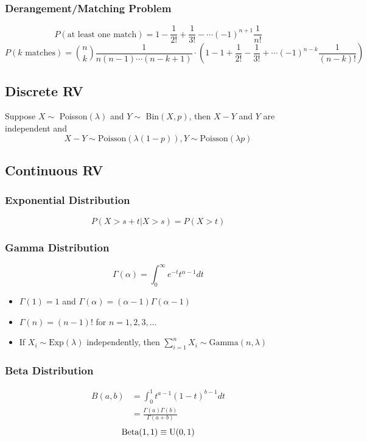 \documentclass{article}
\begin{document}
\subsubsection*{Derangement/Matching Problem}
$$P(\text{at least one match}) = 1 - \frac{1}{2!}+\frac{1}{3!} -\cdots (-1)^{n+1}\frac{1}{n!}$$
$$P(k\text{ matches}) = {n \choose k} \frac{1}{n(n-1)\cdots(n-k+1)}\cdot \left({1- 1 + \frac{1}{2!}-\frac{1}{3!} +\cdots (-1)^{n-k}\frac{1}{(n-k)!}}\right)$$

\begin{multicols}{2}


\subsection{Discrete RV}
Suppose $X \sim$ Poisson$(\lambda)$ and $Y \sim$ Bin$(X,p)$, then
$X-Y$ and $Y$ are independent and 
$$X-Y \sim \text{Poisson}(\lambda(1-p)), Y \sim \text{Poisson}(\lambda p)$$

\subsection{Continuous RV}
\subsubsection*{Exponential Distribution}
\begin{equation*}
 P(X>s+t| X>s) = P(X>t)
\end{equation*}
\subsubsection*{Gamma Distribution}
\begin{equation*}
 \Gamma(\alpha) = \int_{0}^{\infty}e^{-t}t^{\alpha-1}dt
\end{equation*}
\begin{itemize}
 \item $\Gamma(1)= 1$  and $\Gamma(\alpha) = (\alpha-1)\Gamma(\alpha-1)$
 \item $\Gamma(n)=(n-1)!$ for $n = 1,2,3,\dots$
 \item If $X_i \sim \text{Exp}(\lambda)$ independently, then $\sum_{i=1}^n X_i \sim \text{Gamma}(n,\lambda)$
 
\end{itemize}

\subsubsection*{Beta Distribution}
\begin{equation*}
\begin{split}
 B(a,b) &= \int_{0}^{1}t^{a-1}(1-t)^{b-1}dt\\
 &= \frac{\Gamma(a)\Gamma(b)}{\Gamma(a+b)}
\end{split}
\end{equation*}
\begin{equation*}
 \text{Beta}(1,1) \equiv \text{U}(0,1)\\
\end{equation*}


\end{multicols}
\end{document}
